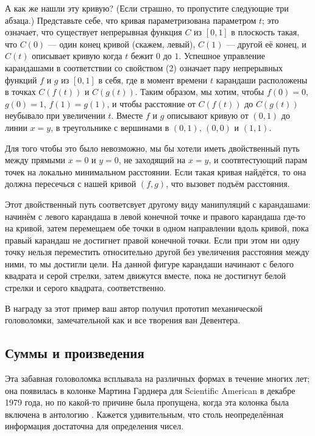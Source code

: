 А как же нашли эту кривую?
(Если страшно, то пропустите следующие три абзаца.)
Представьте себе, что кривая параметризована параметром $t$;
это означает, что существует непрерывная функция $C$ из $[0, 1]$ в плоскость такая, что $C(0)$ --- один конец кривой (скажем, левый), $C(1)$ --- другой её конец, и $C(t)$ описывает кривую когда $t$ бежит $0$ до $1$.
Успешное управление карандашами в соответствии со свойством (2) означает пару непрерывных функций $f$ и $g$ из $[0,1]$ в себя, где в момент времени $t$ карандаши расположены в точках $C(f(t))$ и $C(g(t))$.
Таким образом, мы хотим, чтобы $f (0) = 0$, $g(0) = 1$, $f (1) = g(1)$, и чтобы расстояние от $C(f (t))$ до $C(g(t))$ неубывало при увеличении $t$.
Вместе $f$ и $g$ описывают кривую от $(0,1)$ до линии $x = y$, в треугольнике с вершинами в $(0,1)$, $(0,0)$ и $(1,1)$.

Для того чтобы это было невозможно, мы бы хотели иметь двойственный путь между прямыми $x = 0$ и $y = 0$, не заходящий на $x = y$, и соотвтестующий парам точек на локально минимальном расстоянии.
Если такая кривая найдётся, то она должна пересечься с нашей кривой $(f, g)$, что вызовет подъём расстояния.

Этот двойственный путь соответсвует другому виду манипуляций с карандашами:
начинём с левого карандаша в левой конечной точке и правого карандаша где-то на кривой,
затем перемещаем обе точки в одном направлении вдоль кривой, пока правый карандаш не достигнет правой конечной точки.
Если при этом ни одну точку нельзя переместить относительно другой без увеличения расстояния между ними, то мы достигли цели.
На данной фигуре карандаши начинают с белого квадрата и серой стрелки, затем движутся вместе, пока не достигнут белой стрелки и серого квадрата, соответственно.

В награду за этот пример ваш автор получил прототип механической головоломки, замечательной как и все творения ван Девентера.

\subsection*{Суммы и произведения}

Эта забавная головоломка всплывала на различных формах в течение многих лет; она появилась в колонке Мартина Гарднера для Scientific American в декабре 1979 года, но по какой-то причине была пропущена, когда эта колонка была включена в антологию \cite{29}.
Кажется удивительным, что столь неопределённая информация достаточна для определения чисел.

